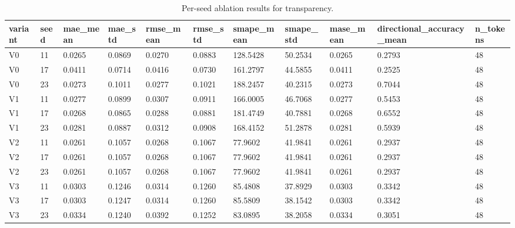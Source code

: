 \begin{table}[htbp]
\centering
\begin{tabular}{lllllllllll}
\hline
variant & seed & mae_mean & mae_std & rmse_mean & rmse_std & smape_mean & smape_std & mase_mean & directional_accuracy_mean & n_tokens \\
\hline
V0 & 11 & 0.0265 & 0.0869 & 0.0270 & 0.0883 & 128.5428 & 50.2534 & 0.0265 & 0.2793 & 48 \\
V0 & 17 & 0.0411 & 0.0714 & 0.0416 & 0.0730 & 161.2797 & 44.5855 & 0.0411 & 0.2525 & 48 \\
V0 & 23 & 0.0273 & 0.1011 & 0.0277 & 0.1021 & 188.2457 & 40.2315 & 0.0273 & 0.7044 & 48 \\
V1 & 11 & 0.0277 & 0.0899 & 0.0307 & 0.0911 & 166.0005 & 46.7068 & 0.0277 & 0.5453 & 48 \\
V1 & 17 & 0.0268 & 0.0865 & 0.0288 & 0.0881 & 181.4749 & 40.7881 & 0.0268 & 0.6552 & 48 \\
V1 & 23 & 0.0281 & 0.0887 & 0.0312 & 0.0908 & 168.4152 & 51.2878 & 0.0281 & 0.5939 & 48 \\
V2 & 11 & 0.0261 & 0.1057 & 0.0268 & 0.1067 & 77.9602 & 41.9841 & 0.0261 & 0.2937 & 48 \\
V2 & 17 & 0.0261 & 0.1057 & 0.0268 & 0.1067 & 77.9602 & 41.9841 & 0.0261 & 0.2937 & 48 \\
V2 & 23 & 0.0261 & 0.1057 & 0.0268 & 0.1067 & 77.9602 & 41.9841 & 0.0261 & 0.2937 & 48 \\
V3 & 11 & 0.0303 & 0.1246 & 0.0314 & 0.1260 & 85.4808 & 37.8929 & 0.0303 & 0.3342 & 48 \\
V3 & 17 & 0.0303 & 0.1247 & 0.0314 & 0.1260 & 85.5809 & 38.1542 & 0.0303 & 0.3342 & 48 \\
V3 & 23 & 0.0334 & 0.1240 & 0.0392 & 0.1252 & 83.0895 & 38.2058 & 0.0334 & 0.3051 & 48 \\
\hline
\end{tabular}
\caption{Per-seed ablation results for transparency.}
\label{table_ablation_per_seed}
\end{table}